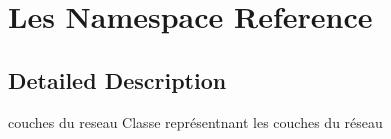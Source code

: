 \hypertarget{namespace_les}{}\section{Les Namespace Reference}
\label{namespace_les}


\subsection{Detailed Description}
couches du reseau Classe représentnant les couches du réseau 